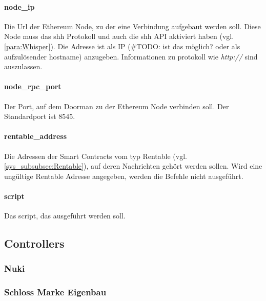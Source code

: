\paragraph{node\_ip}
Die Url der Ethereum Node, zu der eine Verbindung aufgebaut werden soll. Diese Node muss das shh Protokoll und auch die shh API aktiviert haben (vgl. \ref{para:Whisper}). Die Adresse ist als IP (\#TODO: ist das möglich? oder als aufzulösender hostname) anzugeben. Informationen zu protokoll wie \emph{http://} sind auszulassen.
\paragraph{node\_rpc\_port}
Der Port, auf dem Doorman zu der Ethereum Node verbinden soll. Der Standardport ist 8545.
\paragraph{rentable\_address}
Die Adressen der Smart Contracts vom typ Rentable (vgl. \ref{sys_subsubsec:Rentable}), auf deren Nachrichten gehört werden sollen. Wird eine ungültige Rentable Adresse angegeben, werden die Befehle nicht ausgeführt.
\paragraph{script}
Das script, das ausgeführt werden soll.

\subsection{Controllers}
\subsubsection{Nuki}
\subsubsection{Schloss Marke Eigenbau}
